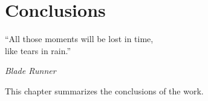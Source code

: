 \chapter{Conclusions}
\label{c:conc}
\epigraph{\enquote{All those moments will be lost in time, \\
like tears in rain.}}{\emph{Blade Runner}}

This chapter summarizes the conclusions of the work.
